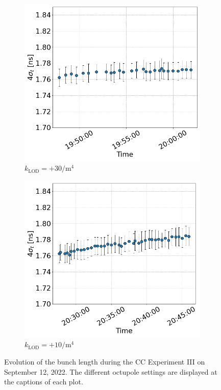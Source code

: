 \begin{figure}[htp]
\begin{subfigure}{.45\textwidth}
    \end{subfigure}
    \begin{subfigure}{.45\textwidth}
            \centering
            \includegraphics[width=.95\linewidth]{images/app_c/bunch_length_cc_md_sep_coast9.png}  
            \caption{$k_\mathrm{LOD}=+30 \mathrm{/m^{4}}$}
    \end{subfigure}
    \begin{subfigure}{.45\textwidth}
        \centering
        \includegraphics[width=.95\linewidth]{images/app_c/bunch_length_cc_md_sep_coast11.png}  
        \caption{$k_\mathrm{LOD}=+10  \mathrm{/m^{4}}$}
\end{subfigure}
    \caption{Evolution of the bunch length during the CC Experiment III on September 12, 2022. The different octupole settings are displayed at the captions of each plot.}
    \label{fig:cc_md_sep_2022_overview_plots_klod_scan_bunch_length}
 \end{figure}



